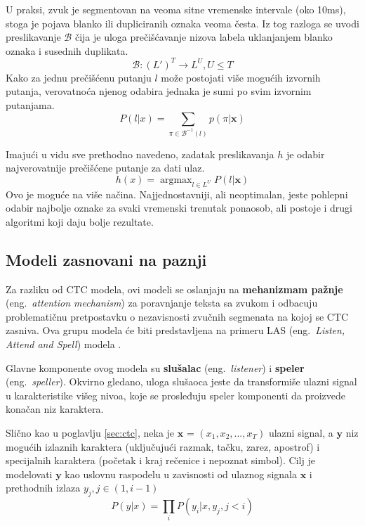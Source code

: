 \documentclass[a4paper]{article}
\DeclareMathOperator*{\argmax}{argmax}
\begin{document}
U praksi, zvuk je segmentovan na veoma sitne vremenske intervale (oko 10ms), stoga je pojava blanko ili dupliciranih oznaka veoma česta. 
Iz tog razloga se uvodi preslikavanje $\mathcal{B}$ čija je uloga prečišćavanje nizova labela uklanjanjem blanko oznaka i susednih duplikata.
\begin{equation*}
  \mathcal{B}: (L')^T \rightarrow L^U, U \leq T
\end{equation*}
Kako za jednu prečišćenu putanju $l$ može postojati više mogućih izvornih putanja, verovatnoća njenog odabira jednaka je sumi po svim izvornim putanjama.
\begin{equation}
\label{eq:beta}
  P(l | x) = \sum_{\pi \in \mathcal{B}^{-1}(l)} p(\pi | \textbf{x})
\end{equation}

Imajući u vidu sve prethodno navedeno, zadatak preslikavanja $h$ je odabir najverovatnije prečišćene putanje za dati ulaz.
\begin{equation}
\label{eq:h_x}
  h(x) = \argmax_{l \in L^U} P(l | \textbf{x})
\end{equation}
Ovo je moguće na više načina.
Najjednostavniji, ali neoptimalan, jeste pohlepni odabir najbolje oznake za svaki vremenski trenutak ponaosob, ali postoje i drugi algoritmi koji daju bolje rezultate.


\subsection{Modeli zasnovani na paznji}

Za razliku od CTC modela, ovi modeli se oslanjaju na \textbf{mehanizmam pažnje} (eng.~{\em attention mechanism}) za poravnjanje teksta sa zvukom i odbacuju problematičnu pretpostavku o nezavisnosti zvučnih segmenata na kojoj se CTC zasniva.
Ova grupu modela će biti predstavljena na primeru LAS (eng.~{\em Listen, Attend and Spell}) modela \cite{chan2015las}. 

Glavne komponente ovog modela su \textbf{slušalac} (eng.~{\em listener}) i \textbf{speler} (eng.~{\em speller}).
Okvirno gledano, uloga slušaoca jeste da transformiše ulazni signal u karakteristike višeg nivoa, koje se prosleđuju speler komponenti da proizvede konačan niz karaktera. 

Slično kao u poglavlju \ref{sec:ctc}, neka je $\textbf{x}$ = $(x_1,  x_2,  ...,  x_T)$ ulazni signal, a $\textbf{y}$ niz mogućih izlaznih karaktera (uključujući razmak, tačku, zarez, apostrof) i specijalnih karaktera (početak i kraj rečenice i nepoznat simbol).
Cilj je modelovati $\textbf{y}$ kao uslovnu raspodelu u zavisnosti od ulaznog signala $\textbf{x}$ i prethodnih izlaza $y_j,  j \in (1,  i-1)$
\begin{equation}
  \label{eq:chain}
  P(y | x) = \prod_i P(y_i | x, y_j, j < i)
\end{equation}
\end{document}
